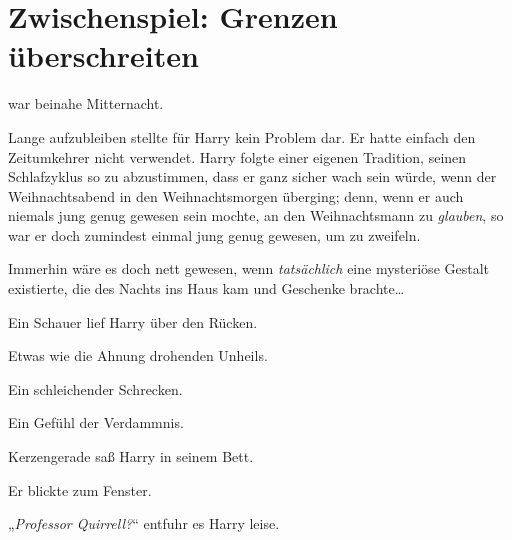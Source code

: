 \chapter{Zwischenspiel: Grenzen überschreiten}

 war beinahe Mitternacht.

\hplettrineextrapara
Lange aufzubleiben stellte für Harry kein Problem dar. Er hatte einfach den Zeitumkehrer nicht verwendet. Harry folgte einer eigenen Tradition, seinen Schlafzyklus so zu abzustimmen, dass er ganz sicher wach sein würde, wenn der Weihnachtsabend in den Weihnachtsmorgen überging; denn, wenn er auch niemals jung genug gewesen sein mochte, an den Weihnachtsmann zu \emph{glauben}, so war er doch zumindest einmal jung genug gewesen, um zu zweifeln.

Immerhin wäre es doch nett gewesen, wenn \emph{tatsächlich} eine mysteriöse Gestalt existierte, die des Nachts ins Haus kam und Geschenke brachte…

Ein Schauer lief Harry über den Rücken.

Etwas wie die Ahnung drohenden Unheils.

Ein schleichender Schrecken.

Ein Gefühl der Verdammnis.

Kerzengerade saß Harry in seinem Bett.

Er blickte zum Fenster.

„\emph{Professor Quirrell?}“ entfuhr es Harry leise.

